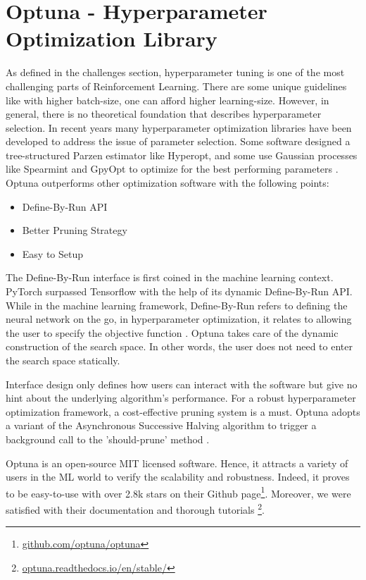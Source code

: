 \section{Optuna - Hyperparameter Optimization Library}

As defined in the challenges section, hyperparameter tuning is one of the most challenging parts of Reinforcement Learning. There are some unique guidelines like with higher batch-size, one can afford higher learning-size. However, in general, there is no theoretical foundation that describes hyperparameter selection. In recent years many hyperparameter optimization libraries have been developed to address the issue of parameter selection. Some software designed a tree-structured Parzen estimator like Hyperopt, and some use Gaussian processes like Spearmint and GpyOpt to optimize for the best performing parameters \cite{optuna_2019}. 
Optuna outperforms other optimization software with the following points:

\begin{itemize}
    \item Define-By-Run API 
    \item Better Pruning Strategy
    \item Easy to Setup
\end{itemize}

The Define-By-Run interface is first coined in the machine learning context. PyTorch surpassed Tensorflow with the help of its dynamic Define-By-Run API. While in the machine learning framework, Define-By-Run refers to defining the neural network on the go, in hyperparameter optimization, it relates to allowing the user to specify the objective function \cite{optuna_2019}. Optuna takes care of the dynamic construction of the search space. In other words, the user does not need to enter the search space statically.

Interface design only defines how users can interact with the software but give no hint about the underlying algorithm's performance. For a robust hyperparameter optimization framework, a cost-effective pruning system is a must. Optuna adopts a variant of the Asynchronous Successive Halving algorithm to trigger a background call to the 'should-prune' method \cite{Li2018}.

Optuna is an open-source MIT licensed software. Hence, it attracts a variety of users in the ML world to verify the scalability and robustness. Indeed, it proves to be easy-to-use with over 2.8k stars on their Github page\footnote{\url{github.com/optuna/optuna}}. Moreover, we were satisfied with their documentation and thorough tutorials \footnote{\url{optuna.readthedocs.io/en/stable/}}.

